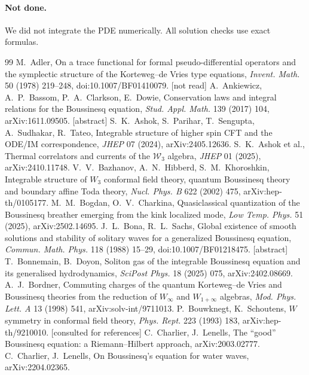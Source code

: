 \documentclass[11pt,a4paper]{article}
\theoremstyle{remark}
\begin{document}
\paragraph{Not done.} We did not integrate the PDE numerically. All solution checks use exact formulas.

\begin{thebibliography}{99}\small
{} M.~Adler, On a trace functional for formal pseudo-differential operators and the symplectic structure of the Korteweg--de Vries type equations, \emph{Invent. Math.} 50 (1978) 219--248, doi:10.1007/BF01410079. [not read]
 A.~Ankiewicz, A.~P.~Bassom, P.~A.~Clarkson, E.~Dowie, Conservation laws and integral relations for the Boussinesq equation, \emph{Stud. Appl. Math.} 139 (2017) 104, arXiv:1611.09505. [abstract]
 S.~K.~Ashok, S.~Parihar, T.~Sengupta, A.~Sudhakar, R.~Tateo, Integrable structure of higher spin CFT and the ODE/IM correspondence, \emph{JHEP} 07 (2024), arXiv:2405.12636.
 S.~K.~Ashok et al., Thermal correlators and currents of the $\mathcal W_3$ algebra, \emph{JHEP} 01 (2025), arXiv:2410.11748.
 V.~V.~Bazhanov, A.~N.~Hibberd, S.~M.~Khoroshkin, Integrable structure of $W_3$ conformal field theory, quantum Boussinesq theory and boundary affine Toda theory, \emph{Nucl. Phys. B} 622 (2002) 475, arXiv:hep-th/0105177.
 M.~M.~Bogdan, O.~V.~Charkina, Quasiclassical quantization of the Boussinesq breather emerging from the kink localized mode, \emph{Low Temp. Phys.} 51 (2025), arXiv:2502.14695.
 J.~L.~Bona, R.~L.~Sachs, Global existence of smooth solutions and stability of solitary waves for a generalized Boussinesq equation, \emph{Commun. Math. Phys.} 118 (1988) 15--29, doi:10.1007/BF01218475. [abstract]
 T.~Bonnemain, B.~Doyon, Soliton gas of the integrable Boussinesq equation and its generalised hydrodynamics, \emph{SciPost Phys.} 18 (2025) 075, arXiv:2402.08669.
 A.~J.~Bordner, Commuting charges of the quantum Korteweg--de Vries and Boussinesq theories from the reduction of $W_\infty$ and $W_{1+\infty}$ algebras, \emph{Mod. Phys. Lett. A} 13 (1998) 541, arXiv:solv-int/9711013.
 P.~Bouwknegt, K.~Schoutens, $W$ symmetry in conformal field theory, \emph{Phys. Rept.} 223 (1993) 183, arXiv:hep-th/9210010. [consulted for references]
 C.~Charlier, J.~Lenells, The ``good'' Boussinesq equation: a Riemann--Hilbert approach, arXiv:2003.02777.
 C.~Charlier, J.~Lenells, On Boussinesq's equation for water waves, arXiv:2204.02365.

\end{thebibliography}
\end{document}
